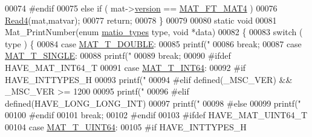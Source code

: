 \begin{DoxyCode}
00074 \textcolor{preprocessor}{#endif}
00075     \textcolor{keywordflow}{else} \textcolor{keywordflow}{if} ( mat->\hyperlink{struct__mat__t_a729c2bc0afc97485057a5af425635b1a}{version} == \hyperlink{group___m_a_t_ggad03442b8378999189d510e3745c702b7a858b4f5da65548219b1c3ad47aa478d3}{MAT\_FT\_MAT4} )
00076         \hyperlink{mat4_8c_a48f37c81ddb08c15bd949ccd31a8aee9}{Read4}(mat,matvar);
00077     \textcolor{keywordflow}{return};
00078 \}
00079 
00080 \textcolor{keyword}{static} \textcolor{keywordtype}{void}
00081 Mat\_PrintNumber(\textcolor{keyword}{enum} \hyperlink{group___m_a_t_gacf7b3b879282b7ab3a51190e49bf3453}{matio\_types} type, \textcolor{keywordtype}{void} *data)
00082 \{
00083     \textcolor{keywordflow}{switch} ( type ) \{
00084         \textcolor{keywordflow}{case} \hyperlink{group___m_a_t_ggacf7b3b879282b7ab3a51190e49bf3453a31e721ecf7e188196f83c32838288797}{MAT\_T\_DOUBLE}:
00085             printf(\textcolor{stringliteral}{"%
00086             \textcolor{keywordflow}{break};
00087         \textcolor{keywordflow}{case} \hyperlink{group___m_a_t_ggacf7b3b879282b7ab3a51190e49bf3453a3a3657d40e9212c923d9b9d03531b64c}{MAT\_T\_SINGLE}:
00088             printf(\textcolor{stringliteral}{"%
00089             \textcolor{keywordflow}{break};
00090 \textcolor{preprocessor}{#ifdef HAVE\_MAT\_INT64\_T}
00091         \textcolor{keywordflow}{case} \hyperlink{group___m_a_t_ggacf7b3b879282b7ab3a51190e49bf3453a9e825b5d18b8f946eaf2b4b57e51c145}{MAT\_T\_INT64}:
00092 \textcolor{preprocessor}{#if HAVE\_INTTYPES\_H}
00093             printf(\textcolor{stringliteral}{"%
00094 \textcolor{preprocessor}{#elif defined(\_MSC\_VER) && \_MSC\_VER >= 1200}
00095             printf(\textcolor{stringliteral}{"%
00096 \textcolor{preprocessor}{#elif defined(HAVE\_LONG\_LONG\_INT)}
00097             printf(\textcolor{stringliteral}{"%
00098 \textcolor{preprocessor}{#else}
00099             printf(\textcolor{stringliteral}{"%
00100 \textcolor{preprocessor}{#endif}
00101             \textcolor{keywordflow}{break};
00102 \textcolor{preprocessor}{#endif}
00103 \textcolor{preprocessor}{#ifdef HAVE\_MAT\_UINT64\_T}
00104         \textcolor{keywordflow}{case} \hyperlink{group___m_a_t_ggacf7b3b879282b7ab3a51190e49bf3453a45547932c46be27118abe08302d7e29f}{MAT\_T\_UINT64}:
00105 \textcolor{preprocessor}{#if HAVE\_INTTYPES\_H}
}}}}}}
\end{DoxyCode}
